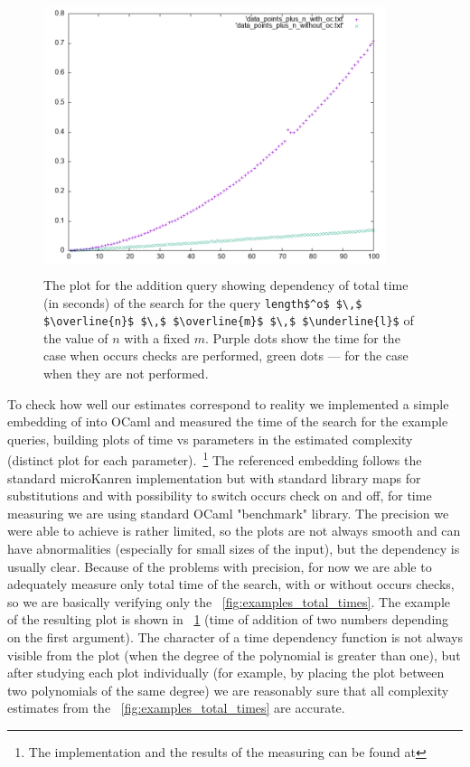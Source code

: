 \begin{figure}[t]
    \includegraphics[width=10cm,height=8cm]{plot_example}
  \caption{The plot for the addition query showing dependency of total time (in seconds) of the search for the query \lstinline|length$^o$ $\,$ $\overline{n}$ $\,$ $\overline{m}$ $\,$ $\underline{l}$| of the value of $n$ with a fixed $m$. Purple dots show the time for the case when occurs checks are performed, green dots --- for the case when they are not performed. }
  \label{fig:plot_example}
\end{figure}

To check how well our estimates correspond to reality we implemented a simple embedding of \mK into OCaml and measured the time of the search for the example queries, building plots of time vs parameters in the estimated complexity (distinct plot for each parameter).~\footnote{The implementation and the results of the measuring can be found at } The referenced embedding follows the standard microKanren implementation but with standard library maps for substitutions and with possibility to switch occurs check on and off, for time measuring we are using standard OCaml "benchmark" library. The precision we were able to achieve is rather limited, so the plots are not always smooth and can have abnormalities (especially for small sizes of the input), but the dependency is usually clear. Because of the problems with precision, for now we are able to adequately measure only total time of the search, with or without occurs checks, so we are basically verifying only the \figureword~\ref{fig:examples_total_times}. 
The example of the resulting plot is shown in \figureword~\ref{fig:plot_example} (time of addition of two numbers depending on the first argument). The character of a time dependency function is not always visible from the plot (when the degree of the polynomial is greater than one), but after studying each plot individually (for example, by placing the plot between two polynomials of the same degree) we are reasonably sure that all complexity estimates from the \figureword~\ref{fig:examples_total_times} are accurate.
